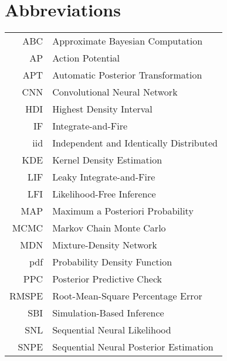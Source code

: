 \chapter*{Abbreviations}
\thispagestyle{plain}



\begin{longtable}{rl}
    ABC & Approximate Bayesian Computation \\
    AP & Action Potential \\
    APT & Automatic Posterior Transformation \\
    CNN & Convolutional Neural Network \\
    HDI & Highest Density Interval \\
    IF & Integrate-and-Fire \\
    iid & Independent and Identically Distributed \\
    KDE & Kernel Density Estimation \\
    LIF & Leaky Integrate-and-Fire \\
    LFI & Likelihood-Free Inference \\
    MAP &  Maximum a Posteriori Probability \\
    MCMC & Markov Chain Monte Carlo \\
    MDN & Mixture-Density Network \\
    pdf & Probability Density Function \\
    PPC & Posterior Predictive Check \\
    RMSPE & Root-Mean-Square Percentage Error \\
    SBI & Simulation-Based Inference \\
    SNL & Sequential Neural Likelihood \\
    SNPE & Sequential Neural Posterior Estimation \\
\end{longtable}

